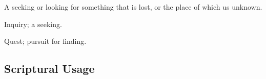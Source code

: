 		\begin{compactitem}
			\item[1] A seeking or looking for something that is lost, or the place of which us unknown.
			\item[2] Inquiry; a seeking.
			\item[3] Quest; pursuit for finding.
		\end{compactitem}



\subsection{Scriptural Usage} %
	\label{SEARCH-SCRIPTURES}

	
	
			
			
		
			
